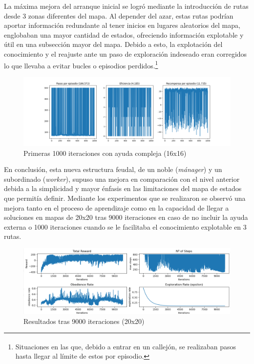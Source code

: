 \documentclass[letterpaper]{article} %
\begin{document}
La máxima mejora del arranque inicial se logró mediante la introducción de rutas desde 3 zonas diferentes del mapa. Al depender del azar, estas
 rutas podrían aportar información redundante al tener inicios en lugares aleatorios del mapa, englobaban una mayor cantidad de estados, ofreciendo
  información explotable y útil en una subsección mayor del mapa. Debido a esto, la explotación del conocimiento y el reajuste ante un paso de 
  exploración indeseado eran corregidos lo que llevaba a evitar bucles o episodios perdidos.\footnote{\textsuperscript{}Situaciones en las que, 
  debido a entrar en un callejón, se realizaban pasos hasta llegar al límite de estos por episodio.}

\begin{figure}[H]
    \centering
    \includegraphics[width=0.9\columnwidth]{ayuda_externa_3paths.png}
    \caption{Primeras 1000 iteraciones con ayuda compleja (16x16)\label{fig:FuN3}}
\end{figure}

En conclusión, esta nueva estructura feudal, de un noble (\textit{mánager}) y un subordinado (\textit{worker}), supuso una mejora en comparación con el nivel anterior debida a la simplicidad y mayor énfasis en las limitaciones del mapa de estados que permitía definir. Mediante los experimentos que se realizaron se observó una mejora tanto en el proceso de aprendizaje como en la capacidad de llegar a soluciones en mapas de 20x20 tras 9000 iteraciones en caso de no incluir la ayuda externa o 1000 iteraciones cuando se le facilitaba el conocimiento explotable en 3 rutas. 

\begin{figure}[H]
    \centering
    \includegraphics[width=0.9\columnwidth]{QL_resumen_final.png}
    \caption{Resultados tras 9000 iteraciones (20x20)}
    \label{fig:FuN1}
\end{figure}
\end{document}
